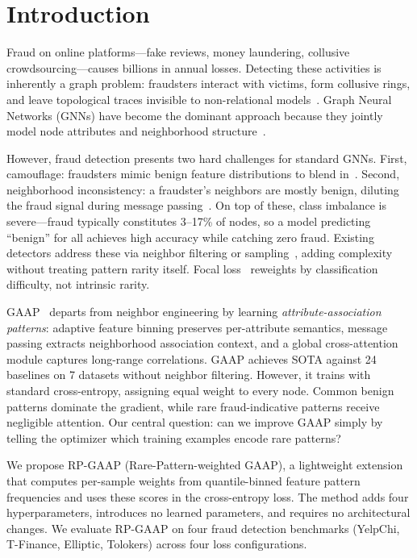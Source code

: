 \section{Introduction}
\label{sec:intro}

Fraud on online platforms---fake reviews, money laundering, collusive crowdsourcing---causes billions in annual losses. Detecting these activities is inherently a graph problem: fraudsters interact with victims, form collusive rings, and leave topological traces invisible to non-relational models~\cite{wang2019fdgars,dou2020enhancing}. Graph Neural Networks (GNNs) have become the dominant approach because they jointly model node attributes and neighborhood structure~\cite{hamilton2017inductive}.

However, fraud detection presents two hard challenges for standard GNNs. First, camouflage: fraudsters mimic benign feature distributions to blend in~\cite{dou2020enhancing}. Second, neighborhood inconsistency: a fraudster's neighbors are mostly benign, diluting the fraud signal during message passing~\cite{liu2020alleviating}. On top of these, class imbalance is severe---fraud typically constitutes 3--17\% of nodes, so a model predicting ``benign'' for all achieves high accuracy while catching zero fraud. Existing detectors address these via neighbor filtering or sampling~\cite{dou2020enhancing,liu2021pick,liu2020alleviating}, adding complexity without treating pattern rarity itself. Focal loss~\cite{lin2017focal} reweights by classification difficulty, not intrinsic rarity.

GAAP~\cite{duan2025gaap} departs from neighbor engineering by learning \textit{attribute-association patterns}: adaptive feature binning preserves per-attribute semantics, message passing extracts neighborhood association context, and a global cross-attention module captures long-range correlations. GAAP achieves SOTA against 24 baselines on 7 datasets without neighbor filtering. However, it trains with standard cross-entropy, assigning equal weight to every node. Common benign patterns dominate the gradient, while rare fraud-indicative patterns receive negligible attention. Our central question: can we improve GAAP simply by telling the optimizer which training examples encode rare patterns?

We propose RP-GAAP (Rare-Pattern-weighted GAAP), a lightweight extension that computes per-sample weights from quantile-binned feature pattern frequencies and uses these scores in the cross-entropy loss. The method adds four hyperparameters, introduces no learned parameters, and requires no architectural changes. We evaluate RP-GAAP on four fraud detection benchmarks (YelpChi, T-Finance, Elliptic, Tolokers) across four loss configurations.
